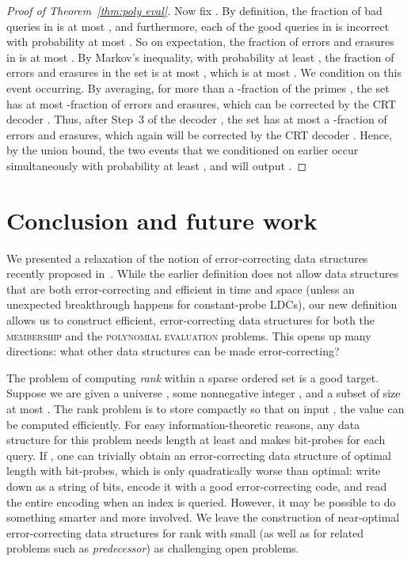 \documentclass[11pt,english]{article}
\newcommand{\noun}[1]{\textsc{#1}}
\theoremstyle{definition}
\theoremstyle{remark}
\begin{document}
\begin{proof}[Proof of Theorem~\ref{thm:poly eval}]
Now fix . By definition, the fraction of bad queries in  is at
most , and furthermore, each of the good queries in  is incorrect with probability
at most . So on expectation, the fraction of errors and
erasures in  is at most . By Markov's inequality, with
probability at least , the fraction of errors and
erasures in the set 
is at most , which is at most . 
We condition on this event occurring. By averaging,
for more than a -fraction of the primes ,
the set  has at most 
-fraction of errors and erasures, which can be corrected
by the CRT decoder . Thus, after Step~3 of the decoder
, the set  has at most a -fraction
of errors and erasures, which again will be corrected by the CRT decoder
. Hence, by the union bound, the two events that we conditioned on
earlier occur simultaneously with probability at least , and  will
output . 
\end{proof}

\section{Conclusion and future work\label{sec:Conclusion}}
We presented a relaxation of the notion of error-correcting data structures
recently proposed in~\cite{wolf:ecdata}. While the earlier definition
does not allow data structures that are both error-correcting and
efficient in time and space (unless an unexpected breakthrough happens for
constant-probe LDCs), our new definition allows us to construct
efficient, error-correcting data structures for both the \noun{membership}
and the \noun{polynomial evaluation} problems. This opens up many
directions: what other data structures can be made error-correcting?

The problem of computing \emph{rank} within a sparse ordered set is a good target.
Suppose we are given a universe , some nonnegative
integer , and a subset  of size at most
. The rank problem is to store  compactly so that on input
, the value  can be computed efficiently.
For easy information-theoretic reasons, any data structure for this problem 
needs length at least  and makes
 bit-probes for each query. If , one
can trivially obtain an error-correcting data structure of optimal length 
with  bit-probes, which is only quadratically worse than optimal: 
write down  as a string of  bits, encode it with a good error-correcting code, 
and read the entire encoding when an index is queried.
However, it may be possible to do something smarter and more involved.
We leave the construction of near-optimal error-correcting data structures for rank with small 
(as well as for related problems such as \emph{predecessor}) as challenging open problems.
\end{document}
